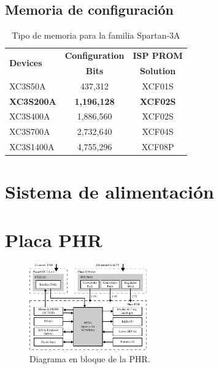 \documentclass[conference]{IEEEtran}
\begin{document}
\subsection{Memoria de configuración}
\label{sec:mem-prog}

\lipsum[14-16]

\begin{table}[!t]
\renewcommand{\arraystretch}{1.3}
\caption{Tipo de memoria para la familia Spartan-3A}
\label{tab:mem-fpga}
\centering
\begin{tabular}{|l|c|c|}
\hline
\multirow{2}{*}{\textbf{Devices}} & \textbf{Configuration} & \textbf{ISP PROM} \\
 & \textbf{Bits} & \textbf{Solution} \\
\hline
XC3S50A   & 437,312   & XCF01S \\
\hline                        
\textbf{XC3S200A}  & \textbf{1,196,128} & \textbf{XCF02S} \\
\hline                        
XC3S400A  & 1,886,560 & XCF02S \\
\hline                        
XC3S700A  & 2,732,640 & XCF04S \\
\hline
XC3S1400A & 4,755,296 & XCF08P     \\
\hline
\end{tabular}
\end{table}

\lipsum[20-22]

\section{Sistema de alimentación}
\label{sec:sist-power}

\lipsum[25-27]

\section{Placa PHR}
\label{sec:placa-phr}

\lipsum[30-33]

\begin{figure}[!t]
\centering
  \includegraphics[width=0.45\textwidth]{img/block}
  \caption{Diagrama en bloque de la PHR.}
  \label{fig:phr-bloque}
\end{figure}
\end{document}
